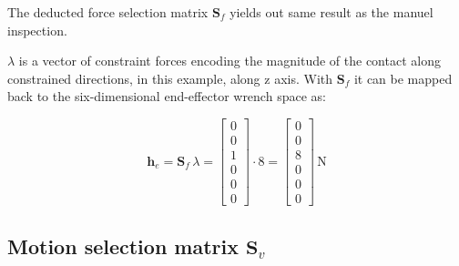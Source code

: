 \documentclass[
	german,%
	accentcolor=9c,%
	ruledheaders=section,%
	class=report,%
	thesis={type=bachelor},%
	fontsize=11pt,%
	parskip=half-,%
	custommargins=true,%
	marginpar=false,%
]{tudapub}
\begin{document}
The deducted force selection matrix $\mathbf{S}_f$ yields out same result as the manuel inspection.


\begin{tcolorbox}[
    colback=gray!8, colframe=gray!45,
    title={Example~4 — Force selection matrix and end-effector wrench},
    fonttitle=\bfseries\small, left=6pt, right=6pt, top=4pt, bottom=4pt]
\small
$\lambda$ is a vector of constraint forces encoding the magnitude of the contact along constrained directions, in this example, along z axis. With $\mathbf{S}_f$ it can be mapped back to the six-dimensional end-effector wrench space as:

\begin{equation*}
    \mathbf{h}_e
    = \mathbf{S}_f\,\lambda
    = \begin{bmatrix}0\\0\\1\\0\\0\\0\end{bmatrix} \cdot 8
    = \begin{bmatrix}0\\0\\8\\0\\0\\0\end{bmatrix}\,\mathrm{N}
\end{equation*}
\end{tcolorbox}

\subsection*{Motion selection matrix \(\mathbf{S}_v\)}
\end{document}
